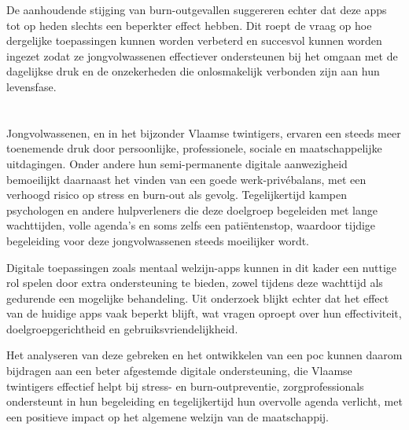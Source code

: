 \vspace{1em}

De aanhoudende stijging van burn-outgevallen suggereren echter dat deze apps tot op heden slechts een beperkter effect hebben. Dit roept de vraag op hoe dergelijke toepassingen kunnen worden verbeterd en succesvol kunnen worden ingezet zodat ze jongvolwassenen effectiever ondersteunen bij het omgaan met de dagelijkse druk en de onzekerheden die onlosmakelijk verbonden zijn aan hun levensfase.

\vspace{1em}

\section{}%
\label{sec:probleemstelling}

\vspace{1em}

Jongvolwassenen, en in het bijzonder Vlaamse twintigers, ervaren een steeds meer toenemende druk door persoonlijke, professionele, sociale en maatschappelijke uitdagingen. Onder andere hun semi-permanente digitale aanwezigheid bemoeilijkt daarnaast het vinden van een goede werk-privébalans, met een verhoogd risico op stress en burn-out als gevolg. Tegelijkertijd kampen psychologen en andere hulpverleners die deze doelgroep begeleiden met lange wachttijden, volle agenda’s en soms zelfs een patiëntenstop, waardoor tijdige begeleiding voor deze jongvolwassenen steeds moeilijker wordt. 

\vspace{1em}

Digitale toepassingen zoals mentaal welzijn-apps kunnen in dit kader een nuttige rol spelen door extra ondersteuning te bieden, zowel tijdens deze wachttijd als gedurende een mogelijke behandeling. Uit onderzoek blijkt echter dat het effect van de huidige apps vaak beperkt blijft, wat vragen oproept over hun effectiviteit, doelgroepgerichtheid en gebruiksvriendelijkheid. 

\vspace{1em}

Het analyseren van deze gebreken en het ontwikkelen van een \acrlong{poc} kunnen daarom bijdragen aan een beter afgestemde digitale ondersteuning, die Vlaamse twintigers effectief helpt bij stress- en burn-outpreventie, zorgprofessionals ondersteunt in hun begeleiding en tegelijkertijd hun overvolle agenda verlicht, met een positieve impact op het algemene welzijn van de maatschappij.

